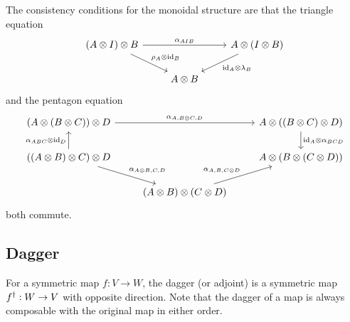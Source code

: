 \begin{extendrightcol}
    The consistency conditions for the monoidal structure are that the triangle equation
    \begin{equation}
    \label{eq:nonabelian:triangle_equation}
    \begin{tikzcd}[ampersand replacement=\&]
        (A \otimes I) \otimes B
            \arrow[rr, "\alpha_{AIB}"] 
            \arrow[dr, "\rho_A \otimes \id{B}"]
        \& \&
        A \otimes (I \otimes B)
            \arrow[dl, "\id{A} \otimes \lambda_B"]
        \\ \&
        A \otimes B
        \&
    \end{tikzcd}
    \end{equation}
    and the pentagon equation
    \begin{equation}
    \label{eq:nonabelian:pentagon_equation}
    \begin{tikzcd}[ampersand replacement=\&]
        (A \otimes (B \otimes C)) \otimes D
            \arrow[rr, "\alpha_{A,B \otimes C, D}"]
        \& \&
        A \otimes ((B \otimes C) \otimes D)
            \arrow[d, "\id{A} \otimes \alpha_{BCD}"]
        \\
        ((A \otimes B) \otimes C) \otimes D
            \arrow[u, "\alpha_{ABC} \otimes \id{D}"]
            \arrow[dr, "\alpha_{A\otimes B, C, D}"]
        \& \&
        A \otimes (B \otimes (C \otimes D))
        \\ \&
        (A \otimes B) \otimes (C \otimes D)
            \arrow[ur, "\alpha_{A,B,C \otimes D}"]
        \&
    \end{tikzcd}
    \end{equation}
    both commute.
\end{extendrightcol}


\subsection{Dagger}
\label{subsec:nonablian:basics:dagger}

For a symmetric map $f: V \to W$, the dagger (or adjoint) is a symmetric map $f^\dagger: W \to V$ with opposite direction.
%
Note that the dagger of a map is always composable with the original map in either order.

